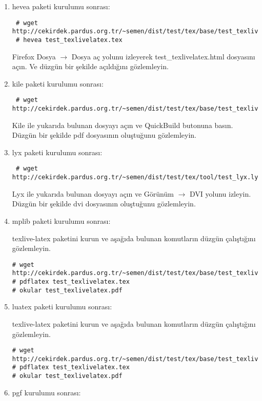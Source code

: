 \documentclass[a4paper,10pt]{article}
\begin{document}
\begin{enumerate}
\item hevea paketi kurulumu sonrası:
 \begin{verbatim}
 # wget http://cekirdek.pardus.org.tr/~semen/dist/test/tex/base/test_texlivelatex.tex
 # hevea test_texlivelatex.tex
 \end{verbatim}
Firefox Dosya $\rightarrow$ Dosya aç yolunu izleyerek test\_texlivelatex.html dosyasını açın. Ve düzgün bir şekilde açıldığını gözlemleyin.

\item kile paketi kurulumu sonrası:
 \begin{verbatim}
 # wget http://cekirdek.pardus.org.tr/~semen/dist/test/tex/base/test_texlivelatex.tex
 \end{verbatim}

Kile ile yukarıda bulunan dosyayı açın ve QuickBuild butonuna basın. Düzgün bir şekilde pdf dosyasının oluştuğunu gözlemleyin.
\item lyx paketi kurulumu sonrası:
 \begin{verbatim}
 # wget http://cekirdek.pardus.org.tr/~semen/dist/test/tex/tool/test_lyx.lyx
 \end{verbatim}

Lyx ile yukarıda bulunan dosyayı açın ve Görünüm $\rightarrow$  DVI yolunu izleyin. Düzgün bir şekilde dvi dosyasının oluştuğunu gözlemleyin.

\item mplib paketi kurulumu sonrası:
  
 texlive-latex paketini kurun ve aşağıda bulunan komutların düzgün çalıştığını gözlemleyin.

\begin{verbatim}
# wget http://cekirdek.pardus.org.tr/~semen/dist/test/tex/base/test_texlivelatex.tex
# pdflatex test_texlivelatex.tex
# okular test_texlivelatex.pdf
\end{verbatim}
\item luatex paketi kurulumu sonrası:
  
 texlive-latex paketini kurun ve aşağıda bulunan komutların düzgün çalıştığını gözlemleyin.

\begin{verbatim}
# wget http://cekirdek.pardus.org.tr/~semen/dist/test/tex/base/test_texlivelatex.tex
# pdflatex test_texlivelatex.tex
# okular test_texlivelatex.pdf
\end{verbatim}

\item  pgf kurulumu sonrası:


\end{enumerate}
\end{document}
